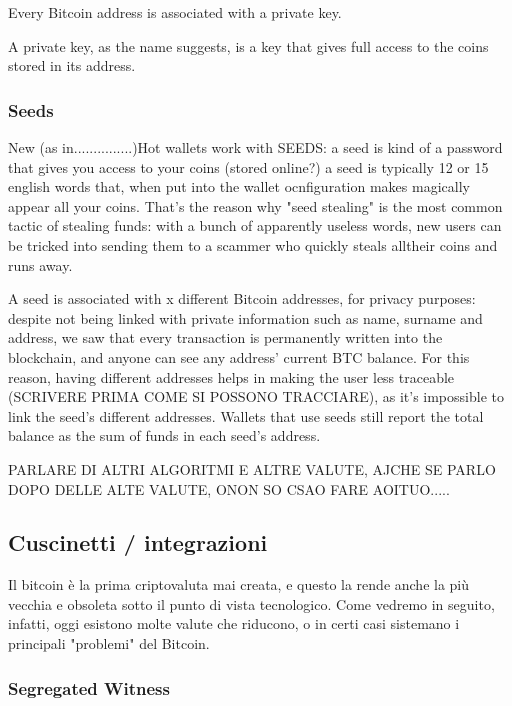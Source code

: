 \documentclass {article}
\begin{document}
Every Bitcoin address is associated with a private key.

A private key, as the name suggests, is a key that gives full access to the coins stored in its address.



\subsubsection {Seeds}



New (as in...............)Hot wallets work with SEEDS: a seed is kind of a password that gives you access to your coins (stored online?) a seed is typically 12 or 15 english words that, when put into the wallet ocnfiguration makes magically appear all your coins. That's the reason why "seed stealing" is the most common tactic of stealing funds: with a bunch of apparently useless words, new users can be tricked into sending them to a scammer who quickly steals alltheir coins and runs away.

A seed is associated with x different Bitcoin addresses, for privacy purposes: despite not being linked with private information such as name, surname and address, we saw that every transaction is permanently written into the blockchain, and anyone can see any address' current BTC balance. For this reason, having different addresses helps in making the user less traceable (SCRIVERE PRIMA COME SI POSSONO TRACCIARE), as it's impossible to link the seed's different addresses. Wallets that use seeds still report the total balance as the sum of funds in each seed's address.



PARLARE DI ALTRI ALGORITMI E ALTRE VALUTE, AJCHE SE PARLO DOPO DELLE ALTE VALUTE, ONON SO CSAO FARE AOITUO.....



\subsection {Cuscinetti / integrazioni}



Il bitcoin è la prima criptovaluta mai creata, e questo la rende anche la più vecchia e obsoleta sotto il punto di vista tecnologico. Come vedremo in seguito, infatti, oggi esistono molte valute che riducono, o in certi casi sistemano i principali "problemi" del Bitcoin.



\subsubsection {Segregated Witness}
\end{document}
